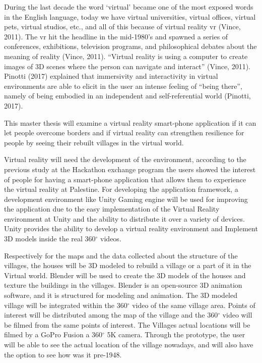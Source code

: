 During the last decade the word ‘virtual’ became one of the most exposed words in the
English language, today we have virtual universities, virtual offices, virtual pets, virtual
studios, etc., and all of this because of virtual reality \acrshort{vr} (Vince, 2011). The \acrshort{vr} hit the
headline in the mid-1980’s and spawned a series of conferences, exhibitions, television
programs, and philosophical debates about the meaning of reality (Vince, 2011). “Virtual
reality is using a computer to create images of 3D scenes where the person can navigate and
interact” (Vince, 2011). Pinotti (2017) explained that immersivity and interactivity in virtual
environments are able to elicit in the user an intense feeling of “being there”, namely of being
embodied in an independent and self-referential world (Pinotti, 2017).

This master thesis will examine a virtual reality smart-phone application if it can let people overcome borders and if virtual reality can strengthen resilience for people by seeing their rebuilt villages in the virtual world. 





Virtual reality will need the development of the environment, according to the previous study at the Hackathon exchange program the users showed the interest of people for having a smart-phone application that allows them to experience the virtual reality at Palestine. For developing the application framework, a development environment like Unity Gaming engine will be used for improving the application due to the easy implementation of the Virtual Reality environment at Unity and the ability to distribute it over a variety of devices. Unity provides the ability to develop a virtual reality environment and Implement 3D models inside the real 360$^{\circ}$ videos.


Respectively for the maps and the data collected about the structure of the villages, the houses will be 3D modeled to rebuild a village or a part of it in the Virtual world. Blender will be used to create the 3D models of the houses and texture the buildings in the villages. Blender is an open-source 3D animation software, and it is structured for modeling and animation. The 3D modeled village will be integrated within the 360$^{\circ}$ video of the same village area. Points of interest will be distributed among the map of the village and the 360$^{\circ}$ video will be filmed from the same points of interest. The Villages actual locations will be filmed by a GoPro Fusion a 360$^{\circ}$ 5K camera. Through the prototype, the user will be able to see the actual location of the village nowadays, and will also have the option to see how was it pre-1948. 


